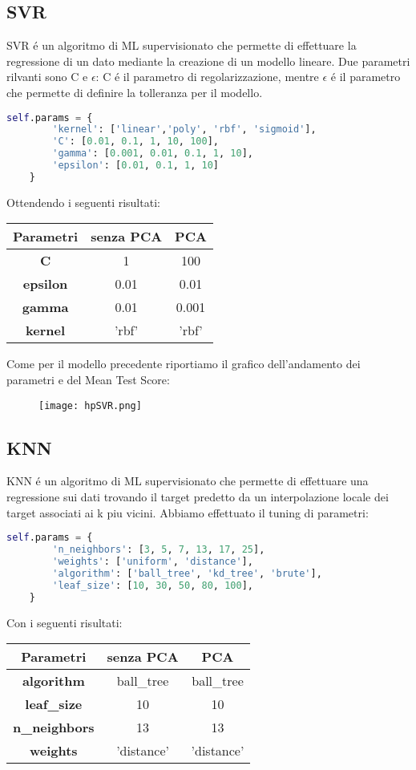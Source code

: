 \documentclass[../../Report.tex]{subfiles}
\begin{document}
\subsection{SVR}
SVR é un algoritmo di ML supervisionato che permette di effettuare la regressione di un dato mediante la creazione di un modello lineare.
Due parametri rilvanti sono C e $\epsilon$: C é il parametro di regolarizzazione, mentre $\epsilon$ é il parametro che permette di definire la tolleranza per il modello.
\begin{lstlisting}[language=Python]
    self.params = {
        'kernel': ['linear','poly', 'rbf', 'sigmoid'],
        'C': [0.01, 0.1, 1, 10, 100],
        'gamma': [0.001, 0.01, 0.1, 1, 10],
        'epsilon': [0.01, 0.1, 1, 10]
    }
\end{lstlisting}
Ottendendo i seguenti risultati:
\begin{table}[h]
    \centering
    \begin{tabular}{|c|c|c|}
    \hline
\textbf{Parametri} & \textbf{senza PCA} & \textbf{PCA} \\ \hline
\textbf{C}& 1 & 100\\
\textbf{epsilon}& 0.01 &  0.01 \\
\textbf{gamma}& 0.01 & 0.001\\
\textbf{kernel}& 'rbf' &  'rbf'\\
\hline
\end{tabular}
\end{table}
Come per il modello precedente riportiamo il grafico dell'andamento dei parametri e del Mean Test Score:
\begin{figure}
    \centering
    \texttt{[image: hpSVR.png]}
\end{figure}
\subsection{KNN}
KNN é un algoritmo di ML supervisionato che permette di effettuare una regressione sui dati trovando il target predetto da un interpolazione locale dei target associati ai k piu vicini.
Abbiamo effettuato il tuning di parametri:
\begin{lstlisting}[language=Python]
    self.params = {
        'n_neighbors': [3, 5, 7, 13, 17, 25],
        'weights': ['uniform', 'distance'],
        'algorithm': ['ball_tree', 'kd_tree', 'brute'],
        'leaf_size': [10, 30, 50, 80, 100],
    }
\end{lstlisting}
Con i seguenti risultati:
\begin{table}[h]
    \centering
    \begin{tabular}{|c|c|c|}
    \hline
\textbf{Parametri} & \textbf{senza PCA} & \textbf{PCA} \\ \hline
\textbf{algorithm}& ball\_tree & ball\_tree\\
\textbf{leaf\_size}& 10 &  10 \\
\textbf{n\_neighbors}& 13 & 13\\
\textbf{weights}& 'distance' &  'distance'\\
\hline
\end{tabular}
\end{table}
\end{document}
